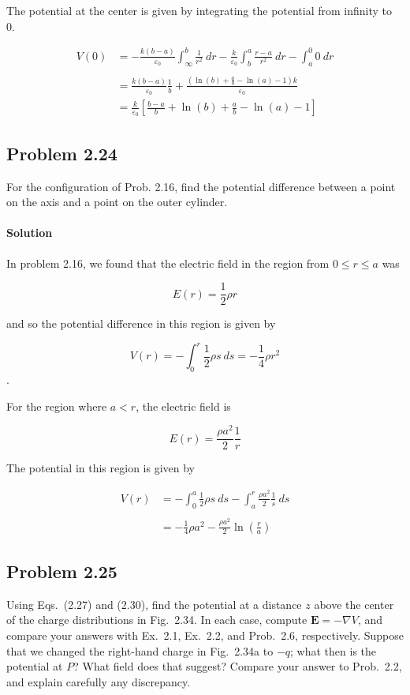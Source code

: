\documentclass{article}
\begin{document}
The potential at the center is given by integrating the potential from infinity to 0.

\begin{align*}
    V(0) &= -\frac{k(b - a)}{\varepsilon_0} \int_{\infty}^b  \frac{1}{r^2}\ dr - \frac{k}{\varepsilon_0}\int_b^a \frac{r - a}{r^2}\ dr - \int_a^0 0 \ dr \\
    \\
    &= \frac{k(b - a)}{\varepsilon_0}\frac{1}{b} + \frac{\left(\ln\left(b\right) + \frac{a}{b} - \ln\left(a\right) - 1\right) k}{{\varepsilon}_{0}} \\
    &= \frac{k}{\varepsilon_0}\left[ \frac{b - a}{b} + \ln\left(b\right) + \frac{a}{b} - \ln\left(a\right) - 1\right]
\end{align*}

\newpage

\subsection*{Problem 2.24}
For the configuration of Prob. 2.16, find the potential difference between a point on the axis and a point on the outer cylinder.

\paragraph{Solution} In problem 2.16, we found that the electric field in the region from $0 \leq r \leq a$ was 

$$
E(r) = \frac{1}{2}\rho r
$$

and so the potential difference in this region is given by 

$$
V(r) = -\int_0^r\frac{1}{2}\rho s \ ds = -\frac{1}{4}\rho r^2
$$.

For the region where $a < r$, the electric field is 

$$
E(r) = \frac{\rho a^2}{2}\frac{1}{r}
$$

The potential in this region is given by 


\begin{align*}
    V(r) &= -\int_0^a\frac{1}{2}\rho s \ ds - \int_a^r \frac{\rho a^2}{2}\frac{1}{s}\ ds \\
    \\
    &= -\frac{1}{4}\rho a^2 - \frac{\rho a^2}{2}\ln(\frac{r}{a})
\end{align*}

\newpage

\subsection*{Problem 2.25}
Using Eqs.~(2.27) and (2.30), find the potential at a distance \( z \) above the
center of the charge distributions in Fig.~2.34. In each case, compute \( \mathbf{E} = -\nabla V \), and
compare your answers with Ex.~2.1, Ex.~2.2, and Prob.~2.6, respectively. Suppose
that we changed the right-hand charge in Fig.~2.34a to \( -q \); what then is the potential
at \( P \)? What field does that suggest? Compare your answer to Prob.~2.2, and explain
carefully any discrepancy.
\end{document}
